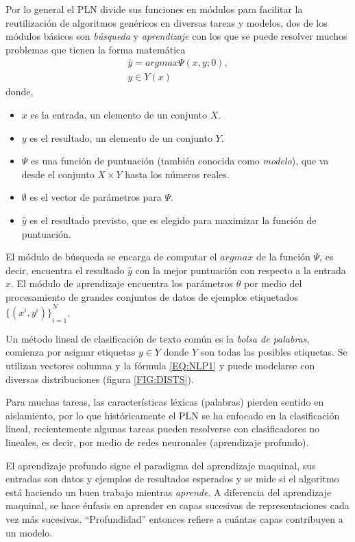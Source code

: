 Por lo general el PLN divide sus funciones en módulos para facilitar la reutilización de algoritmos genéricos en diversas tareas y modelos, dos de los módulos básicos son \emph{búsqueda} y \emph{aprendizaje} con los que se puede resolver muchos problemas que tienen la forma matemática
\begin{equation}
\begin{matrix}
\hat{y}=argmax\Psi(x,y;0),\\
y\in Y(x)
\end{matrix}\label{EQ:NLP1}
\end{equation}
donde,
\begin{itemize}
	\item $x$ es la entrada, un elemento de un conjunto $X$.
	\item $y$ es el resultado, un elemento de un conjunto $Y$.
	\item $\Psi$ es una función de puntuación (también conocida como \emph{modelo}), que va desde el conjunto $X\times Y$ hasta los números reales.
	\item $\emptyset$ es el vector de parámetros para $\Psi$.
	\item $\hat{y}$ es el resultado previsto, que es elegido para maximizar la función de puntuación.
\end{itemize}
El módulo de búsqueda se encarga de computar el $argmax$ de la función $\Psi$, es decir, encuentra el resultado $\hat{y}$ con la mejor puntuación con respecto a la entrada $x$. El módulo de aprendizaje encuentra los parámetros $\theta$ por medio del procesamiento de grandes conjuntos de datos de ejemplos etiquetados ${\{(x^i,y^i)\}}_{i=1}^{N}$.

Un método lineal de clasificación de texto común es la \emph{bolsa de palabras}, comienza por asignar etiquetas $y\in Y$ donde $Y$ son todas las posibles etiquetas. Se utilizan vectores columna y la fórmula \ref{EQ:NLP1} y puede modelarse con diversas distribuciones (figura \ref{FIG:DISTS}).

Para muchas tareas, las características léxicas (palabras) pierden sentido en aislamiento, por lo que históricamente el PLN se ha enfocado en la clasificación lineal, recientemente algunas tareas pueden resolverse con clasificadores no lineales, es decir, por medio de redes neuronales (aprendizaje profundo).

El aprendizaje profundo sigue el paradigma del aprendizaje maquinal, sus entradas son datos y ejemplos de resultados esperados y se mide si el algoritmo está haciendo un buen trabajo mientras \emph{aprende}. A diferencia del aprendizaje maquinal, se hace énfasis en aprender en capas sucesivas de representaciones cada vez más sucesivas. ``Profundidad'' entonces refiere a cuántas capas contribuyen a un modelo.